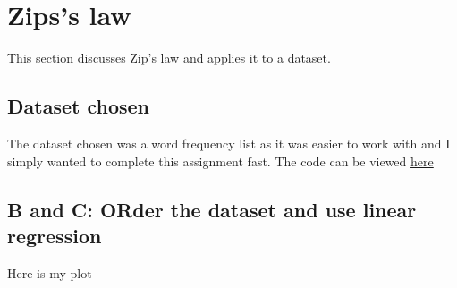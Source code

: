 \documentclass[a4paper,11pt]{article}
\begin{document}
\section{Zips's law}

This section discusses Zip's law and applies it to a dataset. 
\subsection{Dataset chosen}
The dataset chosen was a word frequency list as it was easier to work with and I simply wanted to complete this assignment fast. The code can be viewed \href{https://github.com/RakinAli/Homework-3---DA2210/tree/main}{here}
\subsection{B and C: ORder the dataset and use linear regression}
Here is my plot 


\printbibliography
\end{document}
